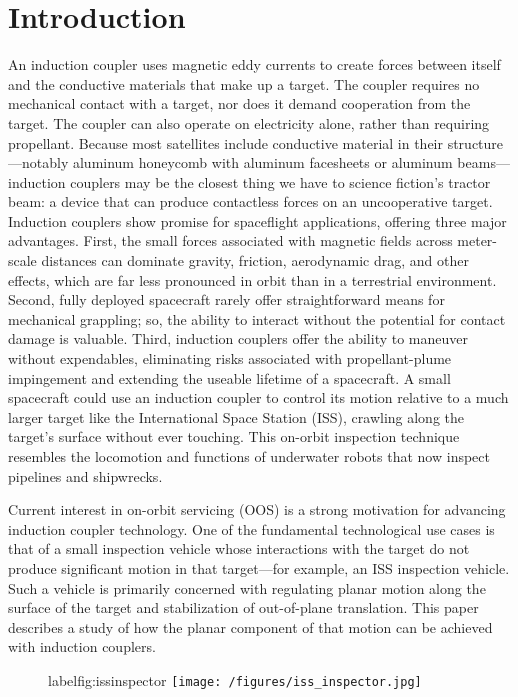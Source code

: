 \section{Introduction} 
An induction coupler uses magnetic eddy currents to create forces between itself and the conductive materials that make up a target. The coupler requires no mechanical contact with a target, nor does it demand cooperation from the target. The coupler can also operate on electricity alone, rather than requiring propellant. Because most satellites include conductive material in their structure—notably aluminum honeycomb with aluminum facesheets or aluminum beams—induction couplers may be the closest thing we have to science fiction's tractor beam: a device that can produce  contactless forces on an uncooperative target. 
Induction couplers show promise for spaceflight applications, offering three major advantages. First, the small forces associated with magnetic fields across meter-scale distances can dominate gravity, friction, aerodynamic drag, and other effects, which are far less pronounced in orbit than in a terrestrial environment. Second, fully deployed spacecraft rarely offer straightforward means for mechanical grappling; so, the ability to interact without the potential for contact damage is valuable. Third, induction couplers offer the ability to maneuver without expendables, eliminating risks associated with propellant-plume impingement and extending the useable lifetime of a spacecraft.
A small spacecraft could use an induction coupler to control its motion relative to a much larger target like the International Space Station (ISS), crawling along the target’s surface without ever touching. This on-orbit inspection technique resembles the locomotion and functions of underwater robots that now inspect pipelines and shipwrecks. 
 
Current interest in on-orbit servicing (OOS) is a strong motivation for advancing induction coupler technology. One of the fundamental technological use cases is that of a small inspection vehicle whose interactions with the target do not produce significant motion in that target—for example, an ISS inspection vehicle. Such a vehicle is primarily concerned with regulating planar motion along the surface of the target and stabilization of out-of-plane translation. This paper  describes a study of how the planar component of that motion can be achieved with induction couplers. 

\begin{figure} label{fig:issinspector}
\texttt{[image: /figures/iss\_inspector.jpg]}
\end{figure}

